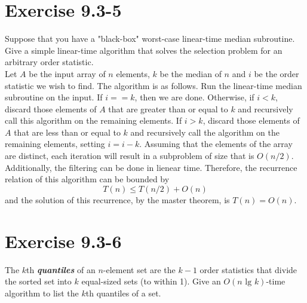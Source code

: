 \documentclass[10pt,a4paper]{article}
\begin{document}
\section*{Exercise 9.3-5}
Suppose that you have a "black-box" worst-case linear-time median subroutine. Give a simple linear-time algorithm that solves the selection problem for an arbitrary order statistic.
\vspace*{\baselineskip}
\\
Let $A$ be the input array of $n$ elements, $k$ be the median of $n$ and $i$ be the order statistic we wish to find. The algorithm is as follows. Run the linear-time median subroutine on the input. If $i==k$, then we are done. Otherwise, if $i<k$, discard those elements of $A$ that are greater than or equal to $k$ and recursively call this algorithm on the remaining elements. If $i>k$, discard those elements of $A$ that are less than or equal to $k$ and recursively call the algorithm on the remaining elements, setting $i=i-k$. Assuming that the elements of the array are distinct, each iteration will result in a subproblem of size that is $O(n/2)$. Additionally, the filtering can be done in lienear time. Therefore, the recurrence relation of this algorithm can be bounded by
\begin{equation}
T(n) \leq T(n/2) + O(n)
\end{equation}
and the solution of this recurrence, by the master theorem, is $T(n) = O(n)$.

\section*{Exercise 9.3-6}
The $k$th \textbf{\textit{quantiles}} of an $n$-element set are the $k-1$ order statistics that divide the sorted set into $k$ equal-sized sets (to within 1). Give an $O(n\text{ lg } k)$-time algorithm to list the $k$th quantiles of a set.
\end{document}
